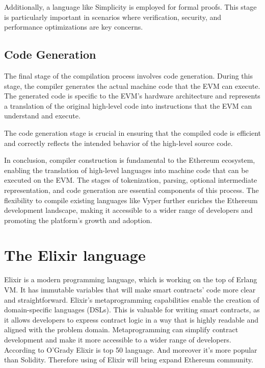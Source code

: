 Additionally, a language like Simplicity is employed for formal proofs. This stage is particularly important in scenarios where verification, security, and performance optimizations are key concerns.

\subsection{Code Generation}

The final stage of the compilation process involves code generation. During this stage, the compiler generates the actual machine code that the EVM can execute. The generated code is specific to the EVM's hardware architecture and represents a translation of the original high-level code into instructions that the EVM can understand and execute.

The code generation stage is crucial in ensuring that the compiled code is efficient and correctly reflects the intended behavior of the high-level source code.


In conclusion, compiler construction is fundamental to the Ethereum ecosystem, enabling the translation of high-level languages into machine code that can be executed on the EVM. The stages of tokenization, parsing, optional intermediate representation, and code generation are essential components of this process. The flexibility to compile existing languages like Vyper further enriches the Ethereum development landscape, making it accessible to a wider range of developers and promoting the platform's growth and adoption.

\section{The Elixir language}
\label{sec:ex}

Elixir is a modern programming language, which is working on the top of Erlang VM. It has immutable variables that will make smart contracts' code more clear and straightforward. Elixir's metaprogramming capabilities enable the creation of domain-specific languages (DSLs). This is valuable for writing smart contracts, as it allows developers to express contract logic in a way that is highly readable and aligned with the problem domain. Metaprogramming can simplify contract development and make it more accessible to a wider range of developers. According to O'Grady \cite{RedMonk} Elixir is top 50 language. And moreover it's more popular than Solidity. Therefore using of Elixir will bring expand Ethereum community.

